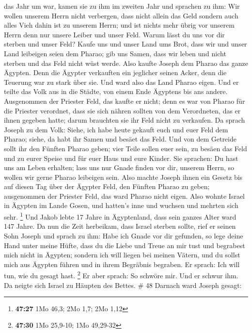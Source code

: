 das Jahr um war, kamen sie zu ihm im zweiten Jahr und sprachen zu ihm:
Wir wollen unserem Herrn nicht verbergen, dass nicht allein das Geld
sondern auch alles Vieh dahin ist zu unserem Herrn; und ist nichts mehr
übrig vor unserem Herrn denn nur unsere Leiber und unser Feld.
 Warum lässt du uns vor dir sterben und unser Feld? Kaufe
uns und unser Land ums Brot, dass wir und unser Land leibeigen seien dem
Pharao; gib uns Samen, dass wir leben und nicht sterben und das Feld
nicht wüst werde.  Also kaufte Joseph dem Pharao das ganze
Ägypten. Denn die Ägypter verkauften ein jeglicher seinen Acker, denn
die Teuerung war zu stark über sie. Und ward also das Land Pharao eigen.
 Und er teilte das Volk aus in die Städte, von einem Ende
Ägyptens bis ans andere.  Ausgenommen der Priester Feld,
das kaufte er nicht; denn es war von Pharao für die Priester verordnet,
dass sie sich nähren sollten von dem Verordneten, das er ihnen gegeben
hatte; darum brauchten sie ihr Feld nicht zu verkaufen.  Da
sprach Joseph zu dem Volk: Siehe, ich habe heute gekauft euch und euer
Feld dem Pharao; siehe, da habt ihr Samen und besäet das Feld.
 Und von dem Getreide sollt ihr den Fünften Pharao geben;
vier Teile sollen euer sein, zu besäen das Feld und zu eurer Speise und
für euer Haus und eure Kinder.  Sie sprachen: Du hast uns
am Leben erhalten; lass uns nur Gnade finden vor dir, unserem Herrn, so
wollen wir gerne Pharao leibeigen sein.  Also machte Joseph
ihnen ein Gesetz bis auf diesen Tag über der Ägypter Feld, den Fünften
Pharao zu geben; ausgenommen der Priester Feld, das ward Pharao nicht
eigen.  Also wohnte Israel in Ägypten im Lande Gosen, und
hatten's inne und wuchsen und mehrten sich sehr. \footnote{\textbf{47:27}
  1Mo 46,3; 2Mo 1,7; 2Mo 1,12}  Und Jakob lebte 17 Jahre in
Ägyptenland, dass sein ganzes Alter ward 147 Jahre.  Da nun
die Zeit herbeikam, dass Israel sterben sollte, rief er seinen Sohn
Joseph und sprach zu ihm: Habe ich Gnade vor dir gefunden, so lege deine
Hand unter meine Hüfte, dass du die Liebe und Treue an mir tust und
begrabest mich nicht in Ägypten;  sondern ich will liegen
bei meinen Vätern, und du sollst mich aus Ägypten führen und in ihrem
Begräbnis begraben. Er sprach: Ich will tun, wie du gesagt hast.
\footnote{\textbf{47:30} 1Mo 25,9-10; 1Mo 49,29-32}  Er
aber sprach: So schwöre mir. Und er schwur ihm. Da neigte sich Israel zu
Häupten des Bettes. \# 48  Darnach ward Joseph gesagt:

